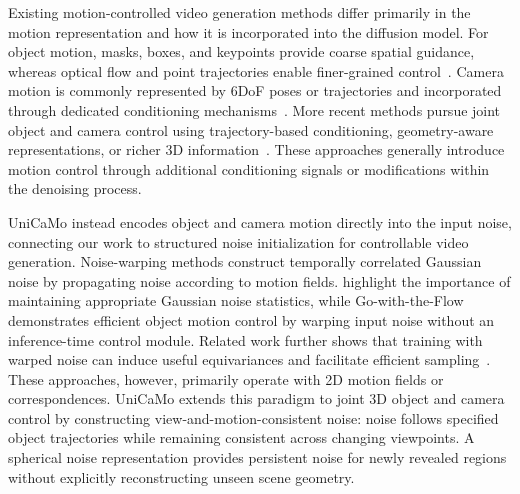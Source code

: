 \ifdefined\arxivbuild\else\documentclass{article}\fi %
\begin{document}
Existing motion-controlled video generation methods differ primarily in the motion representation and how it is incorporated into the diffusion model. For object motion, masks, boxes, and keypoints provide coarse spatial guidance, whereas optical flow and point trajectories enable finer-grained control~\citep{wang2024boximator,li2025magicmotion,geng2025motion,yin2023dragnuwa,zhang2025tora}. Camera motion is commonly represented by 6DoF poses or trajectories and incorporated through dedicated conditioning mechanisms~\citep{he2024cameractrl,wang2024motionctrl,bahmani2025ac3d}. More recent methods pursue joint object and camera control using trajectory-based conditioning, geometry-aware representations, or richer 3D information~\citep{li2025magicmotion,geng2025motion,chu2025wan,zheng2026versecrafter,zhang2026symphomotion}. These approaches generally introduce motion control through additional conditioning signals or modifications within the denoising process.

UniCaMo instead encodes object and camera motion directly into the input noise, connecting our work to structured noise initialization for controllable video generation. Noise-warping methods construct temporally correlated Gaussian noise by propagating noise according to motion fields. \citet{chang2025warped} highlight the importance of maintaining appropriate Gaussian noise statistics, while Go-with-the-Flow~\citep{burgert2025go} demonstrates efficient object motion control by warping input noise without an inference-time control module. Related work further shows that training with warped noise can induce useful equivariances and facilitate efficient sampling~\citep{liu2025equivdm}. These approaches, however, primarily operate with 2D motion fields or correspondences. UniCaMo extends this paradigm to joint 3D object and camera control by constructing view-and-motion-consistent noise: noise follows specified object trajectories while remaining consistent across changing viewpoints. A spherical noise representation provides persistent noise for newly revealed regions without explicitly reconstructing unseen scene geometry.


\end{document}

